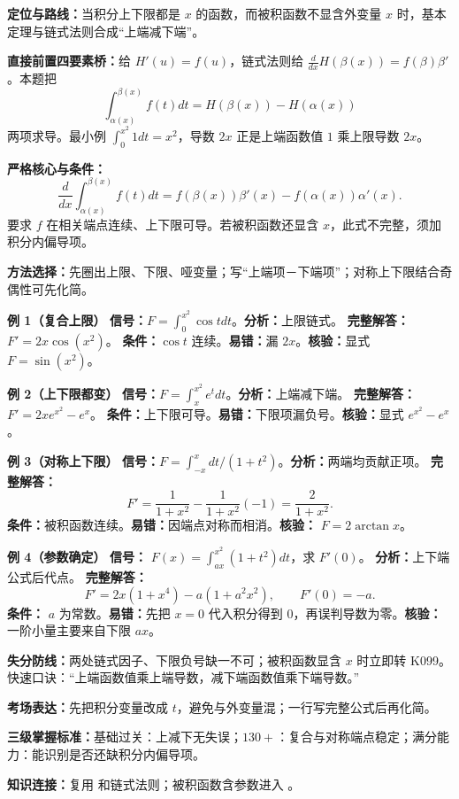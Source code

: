 
\par

\begin{knowledgeBox}
\textbf{定位与路线：}当积分上下限都是 \(x\) 的函数，而被积函数不显含外变量 \(x\) 时，基本定理与链式法则合成“上端减下端”。

\textbf{直接前置四要素桥：}给 \(H'(u)=f(u)\)，链式法则给 \(\frac d{dx}H(\beta(x))=f(\beta)\beta'\)。本题把
\[
\int_{\alpha(x)}^{\beta(x)}f(t)dt=H(\beta(x))-H(\alpha(x))
\]
两项求导。最小例 \(\int_0^{x^2}1dt=x^2\)，导数 \(2x\) 正是上端函数值 \(1\) 乘上限导数 \(2x\)。

\textbf{严格核心与条件：}
\[
\frac d{dx}\int_{\alpha(x)}^{\beta(x)}f(t)dt
=f(\beta(x))\beta'(x)-f(\alpha(x))\alpha'(x).
\]
要求 \(f\) 在相关端点连续、上下限可导。若被积函数还显含 \(x\)，此式不完整，须加积分内偏导项。

\textbf{方法选择：}先圈出上限、下限、哑变量；写“上端项－下端项”；对称上下限结合奇偶性可先化简。

\textbf{例 1（复合上限）}\quad
\textbf{信号：}\(F=\int_0^{x^2}\cos tdt\)。\textbf{分析：}上限链式。
\textbf{完整解答：} \(F'=2x\cos(x^2)\)。
\textbf{条件：}\(\cos t\) 连续。\textbf{易错：}漏 \(2x\)。\textbf{核验：}显式 \(F=\sin(x^2)\)。

\textbf{例 2（上下限都变）}\quad
\textbf{信号：}\(F=\int_x^{x^2}e^tdt\)。\textbf{分析：}上端减下端。
\textbf{完整解答：} \(F'=2xe^{x^2}-e^x\)。
\textbf{条件：}上下限可导。\textbf{易错：}下限项漏负号。\textbf{核验：}显式 \(e^{x^2}-e^x\)。

\textbf{例 3（对称上下限）}\quad
\textbf{信号：}\(F=\int_{-x}^{x}dt/(1+t^2)\)。\textbf{分析：}两端均贡献正项。
\textbf{完整解答：}
\[
F'=\frac1{1+x^2}-\frac1{1+x^2}(-1)=\frac2{1+x^2}.
\]
\textbf{条件：}被积函数连续。\textbf{易错：}因端点对称而相消。\textbf{核验：} \(F=2\arctan x\)。

\textbf{例 4（参数确定）}\quad
\textbf{信号：} \(F(x)=\int_{ax}^{x^2}(1+t^2)dt\)，求 \(F'(0)\)。
\textbf{分析：}上下端公式后代点。
\textbf{完整解答：}
\[
F'=2x(1+x^4)-a(1+a^2x^2),\qquad F'(0)=-a.
\]
\textbf{条件：} \(a\) 为常数。\textbf{易错：}先把 \(x=0\) 代入积分得到 \(0\)，再误判导数为零。\textbf{核验：}一阶小量主要来自下限 \(ax\)。

\textbf{失分防线：}两处链式因子、下限负号缺一不可；被积函数显含 \(x\) 时立即转 K099。快速口诀：“上端函数值乘上端导数，减下端函数值乘下端导数。”

\textbf{考场表达：}先把积分变量改成 \(t\)，避免与外变量混；一行写完整公式后再化简。

\textbf{三级掌握标准：}基础过关：上减下无失误；\(130+\)：复合与对称端点稳定；满分能力：能识别是否还缺积分内偏导项。

\textbf{知识连接：}复用 和链式法则；被积函数含参数进入 。
\end{knowledgeBox}

